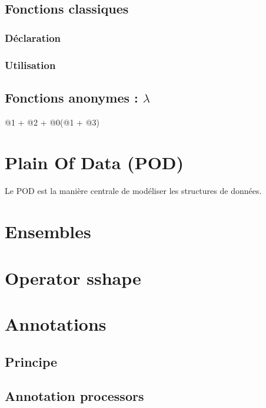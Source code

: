 \documentclass{report}
\begin{document}
\section{Fonctions classiques}

\subsection{Déclaration}

\subsection{Utilisation}

\section{Fonctions anonymes : $\lambda$}

@1 + @2 + @0(@1 + @3)



\chapter{Plain Of Data (POD)}

Le POD est la manière centrale de modéliser les structures de données. 





\chapter{Ensembles}

\chapter{Operator sshape}

\chapter{Annotations}

\section{Principe}

\section{Annotation processors}
\end{document}
